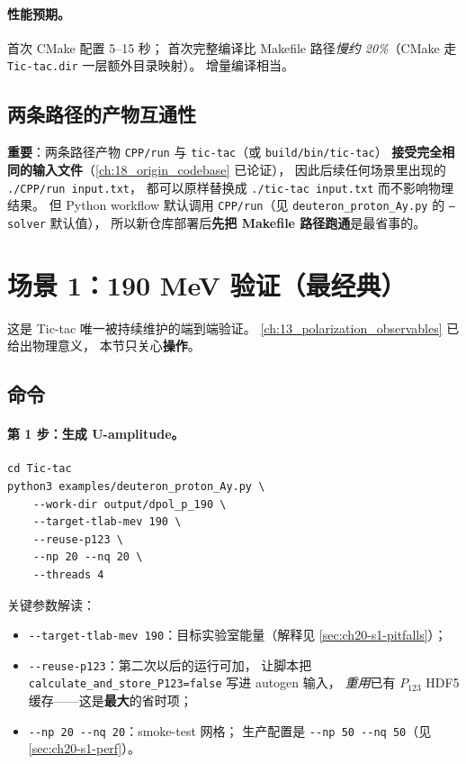 \paragraph{性能预期。}
首次 CMake 配置 5--15 秒；
首次完整编译比 Makefile 路径\emph{慢约 20\%}（CMake 走 \texttt{Tic-tac.dir} 一层额外目录映射）。
增量编译相当。

\subsection{两条路径的产物互通性}
\label{sec:ch20-build-interop}

\textbf{重要}：两条路径产物 \texttt{CPP/run} 与 \texttt{tic-tac}（或 \texttt{build/bin/tic-tac}）
\textbf{接受完全相同的输入文件}（\cref{ch:18_origin_codebase} 已论证），
因此后续任何场景里出现的 \texttt{./CPP/run input.txt}，
都可以原样替换成 \texttt{./tic-tac input.txt} 而不影响物理结果。
但 Python workflow 默认调用 \texttt{CPP/run}（见 \texttt{deuteron\_proton\_Ay.py} 的 \texttt{--solver} 默认值），
所以新仓库部署后\textbf{先把 Makefile 路径跑通}是最省事的。

\section{场景 1：190 MeV 验证（最经典）}
\label{sec:ch20-scenario-190}

这是 Tic-tac 唯一被持续维护的端到端验证。
\cref{ch:13_polarization_observables} 已给出物理意义，
本节只关心\textbf{操作}。

\subsection{命令}
\label{sec:ch20-s1-cmd}

\paragraph{第 1 步：生成 U-amplitude。}
\begin{lstlisting}[style=config,caption={求解器一次运行，输出 \texttt{U\_PW\_elements\_*.txt}。}]
cd Tic-tac
python3 examples/deuteron_proton_Ay.py \
    --work-dir output/dpol_p_190 \
    --target-tlab-mev 190 \
    --reuse-p123 \
    --np 20 --nq 20 \
    --threads 4
\end{lstlisting}
关键参数解读：
\begin{itemize}
  \item \texttt{-{}-target-tlab-mev 190}：目标实验室能量（解释见 \cref{sec:ch20-s1-pitfalls}）；
  \item \texttt{-{}-reuse-p123}：第二次以后的运行可加，
        让脚本把 \texttt{calculate\_and\_store\_P123=false} 写进 autogen 输入，
        \emph{重用}已有 $P_{123}$ HDF5 缓存——这是\textbf{最大}的省时项；
  \item \texttt{-{}-np 20 -{}-nq 20}：smoke-test 网格；
        生产配置是 \texttt{-{}-np 50 -{}-nq 50}（见 \cref{sec:ch20-s1-perf}）。
\end{itemize}

